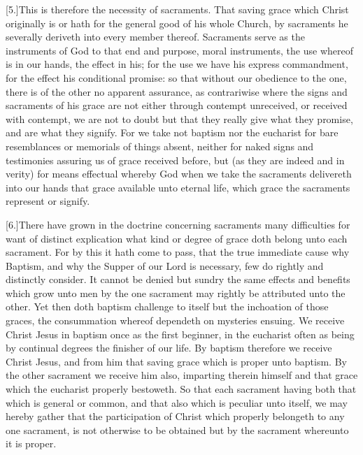[5.]This is therefore the necessity of sacraments. That saving grace which Christ originally is or hath for the general good of his whole Church, by sacraments he severally deriveth into every member thereof. Sacraments serve as the instruments of God to that end and purpose, moral instruments, the use whereof is in our hands, the effect in his; for the use we have his express commandment, for the effect his conditional promise: so that without our obedience to the one, there is of the other no apparent assurance, as contrariwise where the signs and sacraments of his grace are not either through contempt unreceived, or received with contempt, we are not to doubt but that they really give what they promise, and are what they signify. For we take not baptism nor the eucharist for bare resemblances or memorials of things absent, neither for naked signs and testimonies assuring us of grace received before, but (as they are indeed and in verity) for means effectual whereby God when we take the sacraments delivereth into our hands that grace available unto eternal life, which grace the sacraments represent or signify.

[6.]There have grown in the doctrine concerning sacraments many difficulties for want of distinct explication what kind or degree of grace doth belong unto each sacrament. For by  this it hath come to pass, that the true immediate cause why Baptism, and why the Supper of our Lord is necessary, few do rightly and distinctly consider.
 It cannot be denied but sundry the same effects and benefits which grow unto men by the one sacrament may rightly be attributed unto the other. Yet then doth baptism challenge to itself but the inchoation of those graces, the consummation whereof dependeth on mysteries ensuing. We receive Christ Jesus in baptism once as the first beginner, in the eucharist often as being by continual degrees the finisher of our life. By baptism therefore we receive Christ Jesus, and from him that saving grace which is proper unto baptism. By the other sacrament we receive him also, imparting therein himself and that grace which the eucharist properly bestoweth. So that each sacrament having both that which is general or common, and that also which is peculiar unto itself, we may hereby gather that the participation of Christ which properly belongeth to any one sacrament, is not otherwise to be obtained but by the sacrament whereunto it is proper.


